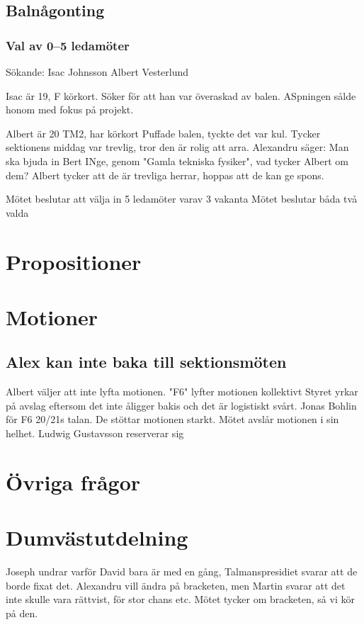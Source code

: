 \documentclass[hidelinks]{../sektionsmote} %
\begin{document}
\subsection{Balnågonting}

\subsubsection{Val av 0--5 ledamöter}
Sökande:
Isac Johnsson
Albert Vesterlund

Isac är 19, F körkort.
Söker för att han var överaskad av balen. ASpningen sålde honom med fokus på projekt.

Albert är 20 TM2, har körkort
Puffade balen, tyckte det var kul.
Tycker sektionens middag var trevlig, tror den är rolig att arra.
Alexandru säger: Man ska bjuda in Bert INge, genom "Gamla tekniska fysiker", vad tycker Albert om dem?
Albert tycker att de är trevliga herrar, hoppas att de kan ge spons.

Mötet beslutar att välja in 5 ledamöter varav 3 vakanta
Mötet beslutar båda två valda

\section{Propositioner}

\section{Motioner}

\subsection{Alex kan inte baka till sektionsmöten}
Albert väljer att inte lyfta motionen.
"F6" lyfter motionen kollektivt
Styret yrkar på avslag eftersom det inte åligger bakis och det är logistiskt svårt.
Jonas Bohlin för F6 20/21s talan. De stöttar motionen starkt.
Mötet avslår motionen i sin helhet.
Ludwig Gustavsson reserverar sig

\section{Övriga frågor}

\section{Dumvästutdelning}
Joseph undrar varför David bara är med en gång, Talmanspresidiet svarar att de borde fixat det.
Alexandru vill ändra på bracketen, men Martin svarar att det inte skulle vara rättvist, för stor chans etc.
Mötet tycker om bracketen, så vi kör på den.
\end{document}

